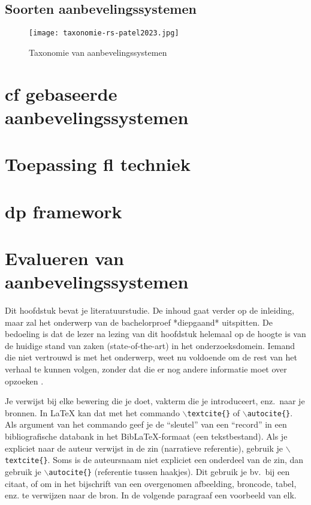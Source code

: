 \subsection{Soorten aanbevelingssystemen}
\begin{figure}
  \centering
  \texttt{[image: taxonomie-rs-patel2023.jpg]}
  \caption[Taxonomie van aanbevelingssystemen]{\label{fig:TaxonomieRS} Taxonomie van aanbevelingssystemen \autocite{Patel2023}}
\end{figure}

\section{\ac{cf} gebaseerde aanbevelingssystemen}
\section{Toepassing \ac{fl} techniek}
\section{\ac{dp} framework}
\section{Evalueren van aanbevelingssystemen}

Dit hoofdstuk bevat je literatuurstudie. De inhoud gaat verder op de inleiding, maar zal het onderwerp van de bachelorproef *diepgaand* uitspitten. De bedoeling is dat de lezer na lezing van dit hoofdstuk helemaal op de hoogte is van de huidige stand van zaken (state-of-the-art) in het onderzoeksdomein. Iemand die niet vertrouwd is met het onderwerp, weet nu voldoende om de rest van het verhaal te kunnen volgen, zonder dat die er nog andere informatie moet over opzoeken \autocite{Pollefliet2011}.

Je verwijst bij elke bewering die je doet, vakterm die je introduceert, enz.\ naar je bronnen. In \LaTeX{} kan dat met het commando \texttt{$\backslash${textcite\{\}}} of \texttt{$\backslash${autocite\{\}}}. Als argument van het commando geef je de ``sleutel'' van een ``record'' in een bibliografische databank in het Bib\LaTeX{}-formaat (een tekstbestand). Als je expliciet naar de auteur verwijst in de zin (narratieve referentie), gebruik je \texttt{$\backslash${}textcite\{\}}. Soms is de auteursnaam niet expliciet een onderdeel van de zin, dan gebruik je \texttt{$\backslash${}autocite\{\}} (referentie tussen haakjes). Dit gebruik je bv.~bij een citaat, of om in het bijschrift van een overgenomen afbeelding, broncode, tabel, enz. te verwijzen naar de bron. In de volgende paragraaf een voorbeeld van elk.

